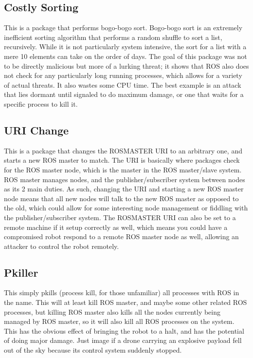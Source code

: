 \documentclass[IEEEtran,letterpaper,10pt,notitlepage,draftclsnofoot,onecolumn]{article}
\begin{document}
\subsection{Costly Sorting}
This is a package that performs bogo-bogo sort. \cite{bogo}
Bogo-bogo sort is an extremely inefficient sorting algorithm that performs a random shuffle to sort a list, recursively.
While it is not particularly system intensive, the sort for a list with a mere 10 elements can take on the order of days.
The goal of this package was not to be directly malicious but more of a lurking threat; it shows that ROS also does not check 
for any particularly long running processes, which allows for a variety of actual threats. It also wastes some CPU time.
The best example is an attack that lies dormant until signaled to do maximum damage, or one that waits for a specific process 
to kill it.

\subsection{URI Change}
This is a package that changes the ROSMASTER URI to an arbitrary one, and starts a new ROS master to match.
The URI is basically where packages check for the ROS master node, which is the master in the ROS master/slave system.
ROS master manages nodes, and the publisher/subscriber system between nodes as its 2 main duties.
As such, changing the URI and starting a new ROS master node means that all new nodes will talk to the new ROS master as 
opposed to the old, which could allow for some interesting node management or fiddling with the publisher/subscriber system.
The ROSMASTER URI can also be set to a remote machine if it setup correctly as well, which means you could have a compromised 
robot respond to a remote ROS master node as well, allowing an attacker to control the robot remotely.

\subsection{Pkiller}
This simply pkills (process kill, for those unfamiliar) all processes with ROS in the name.
This will at least kill ROS master, and maybe some other related ROS processes, but killing ROS master also kills all the nodes currently being managed by ROS master, so it will also kill all ROS processes on the system.
This has the obvious effect of bringing the robot to a halt, and has the potential of doing major damage.
Just image if a drone carrying an explosive payload fell out of the sky because its control system suddenly stopped.
\end{document}
